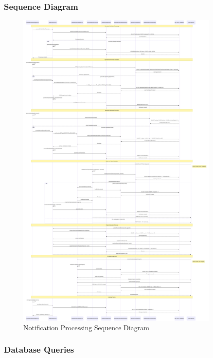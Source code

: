 \documentclass[12pt,a4paper]{article}
\begin{document}
\subsubsection{Sequence Diagram}

\begin{figure}[H]
\centering
\includegraphics[width=0.9\textwidth]{diagrams/notification_sequence.svg}
\caption{Notification Processing Sequence Diagram}
\label{fig:notification-sequence}
\end{figure}

\subsubsection{Database Queries}
\end{document}
